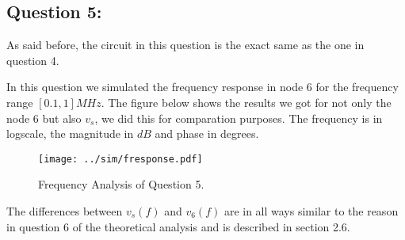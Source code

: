 \subsection{Question 5: }
As said before, the circuit in this question is the exact same as the one in question 4. \par
In this question we simulated the frequency response in node 6 for the frequency range $[0.1,1]MHz$.
The figure below shows the results we got for not only the node 6 but also $v_s$, we did this for comparation purposes. The frequency is in logscale, the magnitude in $dB$ and phase in degrees.
\begin{figure}[H] \centering
\texttt{[image: ../sim/fresponse.pdf]}
\caption{Frequency Analysis of Question 5.}
\label{fig:fresponse}
\end{figure}
The differences between $v_s(f)$ and $v_6(f)$ are in all ways similar to the reason in question 6 of the theoretical analysis and is described in section 2.6. \par

